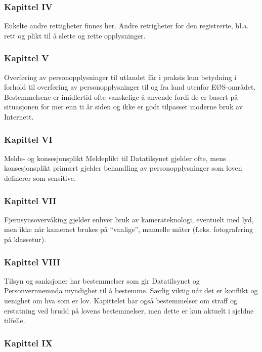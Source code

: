 \documentclass[11pt]{article}
\begin{document}
\subsubsection{Kapittel IV}
\label{sec-17.2.4}

    Enkelte andre rettigheter finnes her. Andre rettigheter for den registrerte,
    bl.a. rett og plikt til å slette og rette opplysninger.
\subsubsection{Kapittel V}
\label{sec-17.2.5}

    Overføring av personopplysninger til utlandet får i praksis kun betydning
    i forhold til overføring av personopplysninger til og fra land utenfor EØS-området. 
    Bestemmelsene er imidlertid ofte vanskelige å anvende fordi de er basert på situasjonen
    for mer enn ti år siden og ikke er godt tilpasset moderne bruk av Internett.
\subsubsection{Kapittel VI}
\label{sec-17.2.6}

    Melde- og konsesjonsplikt Meldeplikt til Datatilsynet gjelder ofte, mens konsesjonsplikt 
    primært gjelder behandling av personopplysninger som loven definerer som sensitive.
\subsubsection{Kapittel VII}
\label{sec-17.2.7}

    Fjernsynsovervåking gjelder enhver bruk av kamerateknologi, eventuelt med lyd, men
    ikke når kameraet brukes på ``vanlige'', manuelle måter (f.eks. fotografering på 
    klassetur).
\subsubsection{Kapittel VIII}
\label{sec-17.2.8}

    Tilsyn og sanksjoner har bestemmelser som gir Datatilsynet og Personvernnemnda
    myndighet til å bestemme. Særlig viktig når det er konflikt og uenighet om hva 
    som er lov. Kapittelet har også bestemmelser om straff og erstatning ved brudd
    på lovens bestemmelser, men dette er kun aktuelt i sjeldne tilfelle.
\subsubsection{Kapittel IX}
\label{sec-17.2.9}
\end{document}
